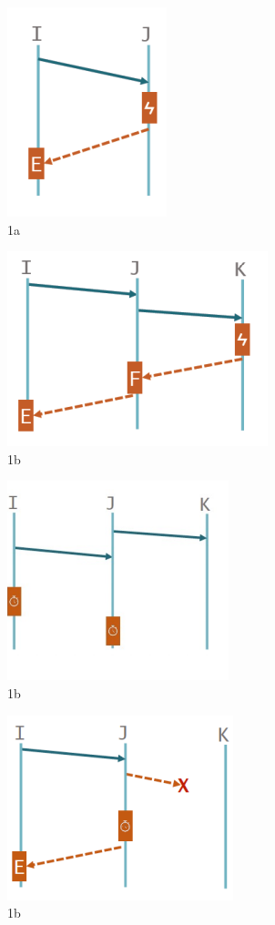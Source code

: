 \documentclass[10pt,a4paper]{report}
\begin{document}
\begin{figure}
	\begin{subfigure}{.5\textwidth}
		\centering
		\includegraphics[width=.3\linewidth]{image-rec1}
		\caption{1a}
		\label{image-rec1}
	\end{subfigure}%
	\begin{subfigure}{.5\textwidth}
		\centering
		\includegraphics[width=.3\linewidth]{image-rec2}
		\caption{1b}
		\label{image-rec2}
	\end{subfigure}
	\begin{subfigure}{.5\textwidth}
		\centering
		\includegraphics[width=.3\linewidth]{image-rec3}
		\caption{1b}
		\label{image-rec3}
	\end{subfigure}
		\begin{subfigure}{.5\textwidth}
		\centering
		\includegraphics[width=.3\linewidth]{image-rec4}
		\caption{1b}
		\label{image-rec4}
	\end{subfigure}
		\begin{subfigure}{.5\textwidth}

\end{subfigure}
\end{figure}
\end{document}
